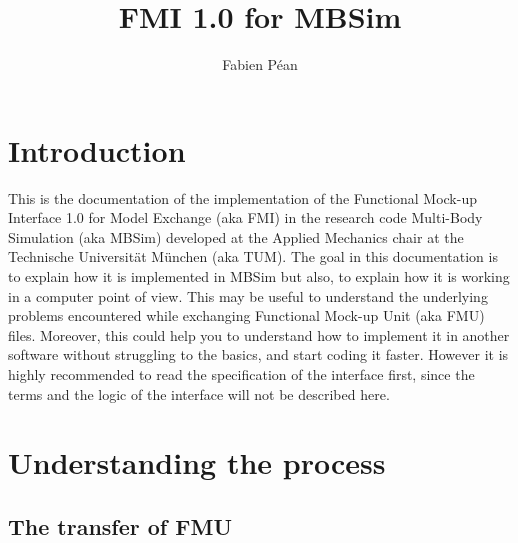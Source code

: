 \documentclass[10pt,a4paper]{report}
\author{Fabien Péan}
\title{FMI 1.0 for MBSim}
\begin{document}
\maketitle

\begingroup
\let\cleardoublepage\relax
\let\clearpage\relax
\tableofcontents
\chapter*{Introduction}
This is the documentation of the implementation of the Functional Mock-up Interface 1.0 for Model Exchange (aka FMI) in the research code Multi-Body Simulation (aka MBSim) developed at the Applied Mechanics chair at the Technische Universität München (aka TUM). The goal in this documentation is to explain how it is implemented in MBSim but also, to explain how it is working in a computer point of view. This may be useful to understand the underlying problems encountered while exchanging Functional Mock-up Unit (aka FMU) files. Moreover, this could help you to understand how to implement it in another software without struggling to the basics, and start coding it faster. However it is highly recommended to read the specification of the interface first, since the terms and the logic of the interface will not be described here.
\endgroup
%
\chapter{Understanding the process}
%
\section{The transfer of FMU}
%
\end{document}
